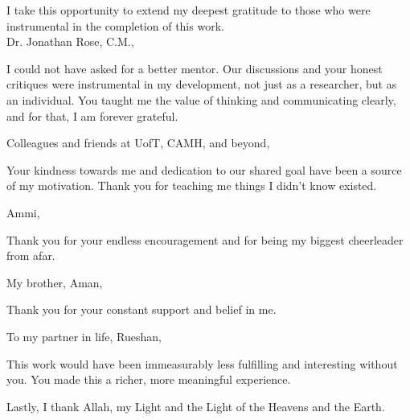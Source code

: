 \noindent I take this opportunity to extend my deepest gratitude to those who were instrumental in the completion of this work.\\

\noindent Dr. Jonathan Rose, C.M.,\vspace{-5pt}
\begin{addmargin}[1em]{2em}
I could not have asked for a better mentor. Our discussions and your honest critiques were instrumental in my development, not just as a researcher, but as an individual. You taught me the value of thinking and communicating clearly, and for that, I am forever grateful.\\
\end{addmargin}

\noindent Colleagues and friends at UofT, CAMH, and beyond,\vspace{-5pt}
\begin{addmargin}[1em]{2em}
\indent Your kindness towards me and dedication to our shared goal have been a source of my motivation. Thank you for teaching me things I didn't know existed.\\
\end{addmargin}

\noindent Ammi,\vspace{-5pt}
\begin{addmargin}[1em]{2em}
Thank you for your endless encouragement and for being my biggest cheerleader from afar.\\
\end{addmargin}

\noindent My brother, Aman,\vspace{-5pt}
\begin{addmargin}[1em]{2em}
Thank you for your constant support and belief in me.\\
\end{addmargin}


\noindent To my partner in life, Rueshan,\vspace{-5pt}
\begin{addmargin}[1em]{2em}
\indent This work would have been immeasurably less fulfilling and interesting without you. You made this a richer, more meaningful experience.\\
\end{addmargin}

\noindent Lastly, I thank Allah, my Light and the Light of the Heavens and the Earth.